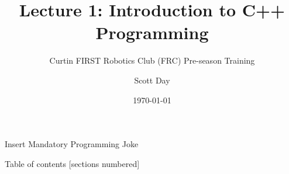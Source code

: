 \documentclass[9pt]{beamer}              %
\title{Lecture 1: Introduction to C++ Programming}
\subtitle{Curtin FIRST Robotics Club (FRC) Pre-season Training}
\date{\today}
\author{Scott Day}
\institute{Curtin University}
\begin{document}


\maketitle

\begin{frame}[fragile]{Insert Mandatory Programming Joke}
    \begin{center}
    \end{center}
\end{frame}

\begin{frame}{Table of contents}
  [sections numbered]
  \tableofcontents[hideallsubsections]
\end{frame}









\end{document}

